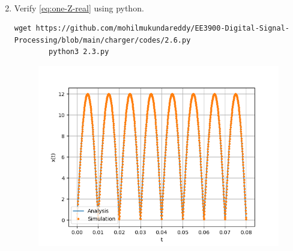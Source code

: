 \documentclass[journal,12pt,twocolumn]{IEEEtran}
\renewcommand\thesection{\arabic{section}}
\begin{document}
\begin{enumerate}[label=\thesection.\arabic*,ref=\thesection.\theenumi]
\begin{align}
    \end{align}
    \item Verify 
    \eqref{eq:one-Z-real}
    using python.\\
     \solution 
        \begin{lstlisting}
wget https://github.com/mohilmukundareddy/EE3900-Digital-Signal-Processing/blob/main/charger/codes/2.6.py
        python3 2.3.py
        \end{lstlisting}
          \begin{figure}[!ht]
			\centering
			\includegraphics[width=\columnwidth]{./figs/2.6.png}
			\caption{}
\end{figure}
    \end{enumerate}
\end{document}
